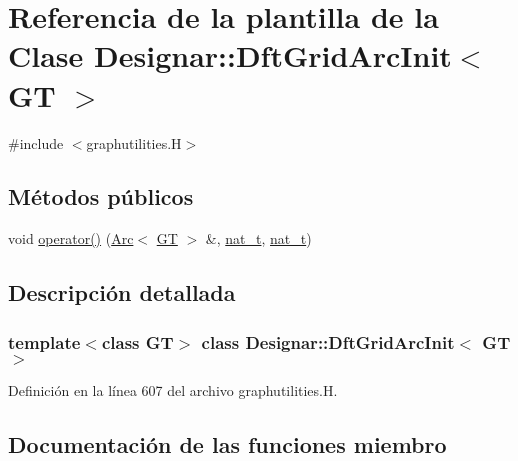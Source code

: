 \hypertarget{class_designar_1_1_dft_grid_arc_init}{}\section{Referencia de la plantilla de la Clase Designar\+:\+:Dft\+Grid\+Arc\+Init$<$ GT $>$}
\label{class_designar_1_1_dft_grid_arc_init}


{\ttfamily \#include $<$graphutilities.\+H$>$}

\subsection*{Métodos públicos}
\begin{DoxyCompactItemize}
\item 
void \hyperlink{class_designar_1_1_dft_grid_arc_init_aa454d871716af2f3a9c7c0758b8f8af4}{operator()} (\hyperlink{namespace_designar_a3f55fb5513d62ff47cbc8f72b8e95d6f}{Arc}$<$ \hyperlink{demo-buildgraph_8_c_a3001c40d2c31ca87ed96cd7d1334a55e}{GT} $>$ \&, \hyperlink{namespace_designar_aa72662848b9f4815e7bf31a7cf3e33d1}{nat\+\_\+t}, \hyperlink{namespace_designar_aa72662848b9f4815e7bf31a7cf3e33d1}{nat\+\_\+t})
\end{DoxyCompactItemize}


\subsection{Descripción detallada}
\subsubsection*{template$<$class GT$>$\newline
class Designar\+::\+Dft\+Grid\+Arc\+Init$<$ G\+T $>$}



Definición en la línea 607 del archivo graphutilities.\+H.



\subsection{Documentación de las funciones miembro}
\mbox{\label{class_designar_1_1_dft_grid_arc_init_aa454d871716af2f3a9c7c0758b8f8af4}} 
